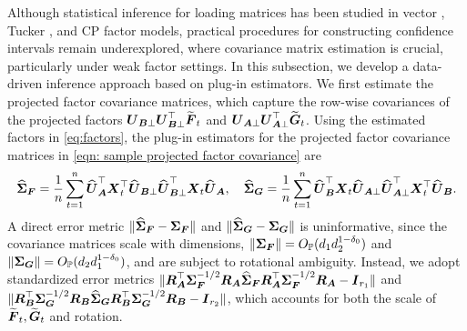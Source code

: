 \documentclass[11pt,letterpaper]{article}
\theoremstyle{definition}
\newcommand{\cano}[1]{\widetilde{\mathbf{#1}}}
\begin{document}
Although statistical inference for loading matrices has been studied in vector \citep{bai2003inferential}, Tucker \citep{chen2023statistical}, and CP \citep{chen2026estimation} factor models, practical procedures for constructing confidence intervals remain underexplored, where covariance matrix estimation is crucial, particularly under weak factor settings. In this subsection, we develop a data-driven inference approach based on plug-in estimators. %
We first estimate the projected factor covariance matrices, which capture the row-wise covariances of the projected factors $\bU_{\bB\perp} \bU_{\bB\perp}^{\top}\cano \bF_t$ and $\bU_{\bA\perp} \bU_{\bA\perp}^{\top}\cano \bG_t$. Using the estimated factors in \eqref{eq:factors}, the plug-in estimators for the projected factor covariance matrices in \eqref{eqn: sample projected factor covariance} are
\begin{equation} \label{eqn: sample projected factor covariance estimate}
\widehat{\boldsymbol{\Sigma}}_{\boldsymbol{F}} = \frac{1}{n} \sum_{t=1}^n \widehat{\boldsymbol{U}}_{\boldsymbol{A}}^{\top} \boldsymbol{X}_t^{\top} \widehat{\boldsymbol{U}}_{\boldsymbol{B}\perp} \widehat{\boldsymbol{U}}_{\boldsymbol{B}\perp}^{\top} \boldsymbol{X}_t \widehat{\boldsymbol{U}}_{\boldsymbol{A}}, \quad 
\widehat{\boldsymbol{\Sigma}}_{\boldsymbol{G}} = \frac{1}{n} \sum_{t=1}^n \widehat{\boldsymbol{U}}_{\boldsymbol{B}}^{\top} \boldsymbol{X}_t \widehat{\boldsymbol{U}}_{\boldsymbol{A}\perp} \widehat{\boldsymbol{U}}_{\boldsymbol{A}\perp}^{\top} \boldsymbol{X}_t^{\top} \widehat{\boldsymbol{U}}_{\boldsymbol{B}} .
\end{equation}
A direct error metric $\|\widehat{\boldsymbol{\Sigma}}_{\boldsymbol{F}} - \boldsymbol{\Sigma}_{\boldsymbol{F}}\|$ and $\|\widehat{\boldsymbol{\Sigma}}_{\boldsymbol{G}} - \boldsymbol{\Sigma}_{\boldsymbol{G}}\|$ is uninformative,  since the covariance matrices scale with dimensions, $\|\boldsymbol{\Sigma}_{\boldsymbol{F}}\| = O_{\mathbb{P}}(d_1d_2^{1-\delta_0})$ and $\|\boldsymbol{\Sigma}_{\boldsymbol{G}}\| = O_{\mathbb{P}}(d_2d_1^{1-\delta_0})$, and are subject to rotational ambiguity. Instead, we adopt standardized error metrics $\|\boldsymbol{R}_{\boldsymbol{A}}^{\top}\boldsymbol{\Sigma}_{\boldsymbol{F}}^{-1/2}\boldsymbol{R}_{\boldsymbol{A}}\widehat{\boldsymbol{\Sigma}}_{\boldsymbol{F}}\boldsymbol{R}_{\boldsymbol{A}}^{\top}\boldsymbol{\Sigma}_{\boldsymbol{F}}^{-1/2}\boldsymbol{R}_{\boldsymbol{A}} - \boldsymbol{I}_{r_1}\|$ and $\|\boldsymbol{R}_{\boldsymbol{B}}^{\top}\boldsymbol{\Sigma}_{\boldsymbol{G}}^{-1/2}\boldsymbol{R}_{\boldsymbol{B}}\widehat{\boldsymbol{\Sigma}}_{\boldsymbol{G}}\boldsymbol{R}_{\boldsymbol{B}}^{\top}\boldsymbol{\Sigma}_{\boldsymbol{G}}^{-1/2}\boldsymbol{R}_{\boldsymbol{B}} - \boldsymbol{I}_{r_2}\|$, which accounts for both the scale of $\cano \bF_t,\cano \bG_t$ and rotation. 
\end{document}
